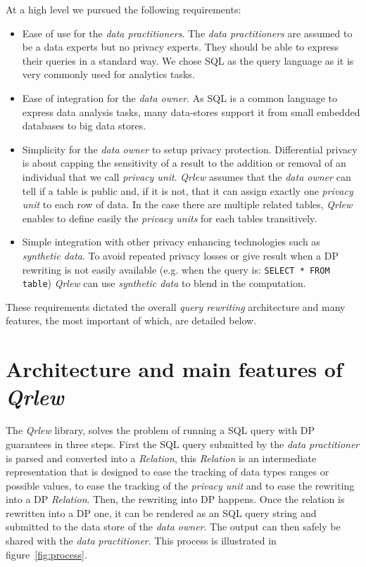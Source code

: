 \documentclass{article}
\newcommand{\qrlew}{\emph{Qrlew}}
\begin{document}
    At a high level we pursued the following requirements:
    \begin{itemize}
        \item Ease of use for the \emph{data practitioners}. The \emph{data practitioners} are assumed to be a data experts but no privacy experts. They should be able to express their queries in a standard way. We chose SQL as the query language as it is very commonly used for analytics tasks.
        \item Ease of integration for the \emph{data owner}. As SQL is a common language to express data analysis tasks, many data-stores support it from small embedded databases to big data stores.
        \item Simplicity for the \emph{data owner} to setup privacy protection. Differential privacy is about capping the sensitivity of a result to the addition or removal of an individual that we call \emph{privacy unit}. \qrlew{} assumes that the \emph{data owner} can tell if a table is public and, if it is not, that it can assign exactly one \emph{privacy unit} to each row of data. In the case there are multiple related tables, \qrlew{} enables to define easily the \emph{privacy units} for each tables transitively.
        \item Simple integration with other privacy enhancing technologies such as \emph{synthetic data}. To avoid repeated privacy losses or give result when a DP rewriting is not easily available (e.g. when the query is: \texttt{SELECT * FROM table}) \qrlew{} can use \emph{synthetic data} to blend in the computation.
    \end{itemize}
    
    These requirements dictated the overall \emph{query rewriting} architecture and many features, the most important of which, are detailed below.
    
    \section{Architecture and main features of \qrlew}
    
    The \qrlew{} library, solves the problem of running a SQL query with DP guarantees in three steps. First the SQL query submitted by the \emph{data practitioner} is parsed and converted into a \emph{Relation}, this \emph{Relation} is an intermediate representation that is designed to ease the tracking of data types ranges or possible values, to ease the tracking of the \emph{privacy unit} and to ease the rewriting into a DP \emph{Relation}. Then, the rewriting into DP happens. Once the relation is rewritten into a DP one, it can be rendered as an SQL query string and submitted to the data store of the \emph{data owner}. The output can then safely be shared with the \emph{data practitioner}. This process is illustrated in figure~\ref{fig:process}.
    
\end{document}
